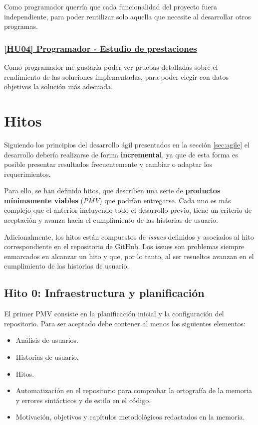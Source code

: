 Como programador querría que cada funcionalidad del proyecto fuera independiente, para poder reutilizar solo aquella que necesite al desarrollar otros programas.

\subsubsection*{\href{https://github.com/dipzza/ultrastar-song2txt/issues/11}{[HU04] Programador - Estudio de prestaciones}}

Como programador me gustaría poder ver pruebas detalladas sobre el rendimiento de las soluciones implementadas, para poder elegir con datos objetivos la solución más adecuada.


\section{Hitos}

Siguiendo los principios del desarrollo ágil presentados en la sección \ref{sec:agile} el desarrollo debería realizarse de forma \textbf{incremental}, ya que de esta forma es posible presentar resultados frecuentemente y cambiar o adaptar los requerimientos.

Para ello, se han definido hitos, que describen una serie de \textbf{productos mínimamente viables} (\textit{PMV}) que podrían entregarse. Cada uno es más complejo que el anterior incluyendo todo el desarrollo previo, tiene un criterio de aceptación y avanza hacia el cumplimiento de las historias de usuario.

Adicionalmente, los hitos están compuestos de \textit{issues} definidos y asociados al hito correspondiente en el repositorio de GitHub. Los issues son problemas siempre enmarcados en alcanzar un hito y que, por lo tanto, al ser resueltos avanzan en el cumplimiento de las historias de usuario.


\subsection*{Hito 0: Infraestructura y planificación}

El primer PMV consiste en la planificación inicial y la configuración del repositorio. Para ser aceptado debe contener al menos los siguientes elementos:

\begin{itemize}
	\item{Análisis de usuarios.}
	\item{Historias de usuario.}
	\item{Hitos.}
	\item{Automatización en el repositorio para comprobar la ortografía de la memoria y errores sintácticos y de estilo en el código.}
	\item{Motivación, objetivos y capítulos metodológicos redactados en la memoria.}
\end{itemize}

